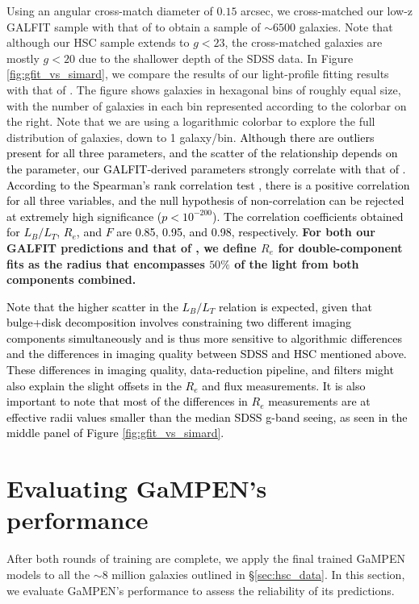 \documentclass[linenumbers,twocolumn,twocolappendix]{aastex631}
\newcommand\gampen{GaMPEN}
\begin{document}
\begin{CJK*}{UTF8}{gbsn}
Using an angular cross-match diameter of $0.15$ arcsec, we cross-matched our low-z GALFIT sample with that of \citet{simard_11} to obtain a sample of $\sim6500$ galaxies. Note that although our HSC sample extends to $g < 23$, the cross-matched galaxies are mostly $g < 20$ due to the shallower depth of the SDSS data. In Figure \ref{fig:gfit_vs_simard}, we compare the results of our light-profile fitting results with that of \citet{simard_11}. The figure shows galaxies in hexagonal bins of roughly equal size, with the number of galaxies in each bin represented according to the colorbar on the right. Note that we are using a logarithmic colorbar to explore the full distribution of galaxies, down to 1 galaxy/bin. \textcolor{black}{Although there are outliers present for all three parameters, and the scatter of the relationship depends on the parameter, our GALFIT-derived parameters strongly correlate with that of \citet{simard_11}. According to the Spearman's rank correlation test \citep[see][for more details]{spearman}, there is a positive correlation for all three variables, and the null hypothesis of non-correlation can be rejected at extremely high significance ($p < 10^{-200}$). The correlation coefficients obtained for $L_B/L_T$, $R_e$, and $F$ are 0.85, 0.95, and 0.98, respectively.} \textbf{For both our GALFIT predictions and that of \citet{simard_11}, we define $R_e$ for double-component fits as the radius that encompasses $50\%$ of the light from both components combined.}

\textcolor{black}{Note that the higher scatter in the $L_B/L_T$ relation is expected, given that bulge+disk decomposition involves constraining two different imaging components simultaneously and is thus more sensitive to algorithmic differences and the differences in imaging quality between SDSS and HSC mentioned above. These differences in imaging quality, data-reduction pipeline, and filters \citep{hsc_filters} might also explain the slight offsets in the $R_e$ and flux measurements. It is also important to note that most of the differences in $R_e$ measurements are at effective radii values smaller than the median SDSS g-band seeing, as seen in the middle panel of Figure \ref{fig:gfit_vs_simard}. } 

\section{Evaluating \gampen{}'s performance} \label{sec:results}
After both rounds of training are complete, we apply the final trained \gampen{} models to all the $\sim 8$ million galaxies outlined in \S \ref{sec:hsc_data}. In this section, we evaluate \gampen{}'s performance to assess the reliability of its predictions.



\end{CJK*}
\end{document}

